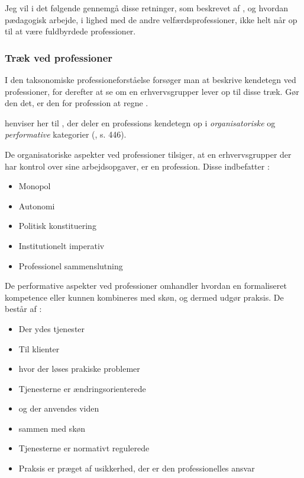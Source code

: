 Jeg vil i det følgende gennemgå disse retninger, som beskrevet af \citeauthor{frederiksenVelfaerdsprofessionerMellemOmsorg2017}, og hvordan pædagogisk arbejde, i lighed med de andre velfærdsprofessioner, ikke helt når op til at være fuldbyrdede professioner.

\subsubsection{Træk ved professioner}
I den taksonomiske professioneforståelse forsøger man at beskrive kendetegn ved professioner, for derefter at se om en erhvervsgrupper lever op til disse træk.
Gør den det, er den for profession at regne \autocite[s.446]{frederiksenVelfaerdsprofessionerMellemOmsorg2017}.

\citeauthor{frederiksenVelfaerdsprofessionerMellemOmsorg2017} henviser her til \citeauthor{molanderProfesjonsstudierIntroduksjon2008}, der deler en professions kendetegn op i \textit{organisatoriske} og \textit{performative} kategorier (\citeyear{frederiksenVelfaerdsprofessionerMellemOmsorg2017}, s. 446).

De organisatoriske aspekter ved professioner tilsiger, at en erhvervsgrupper der har kontrol over sine arbejdsopgaver, er en profession. Disse indbefatter \autocite[s. 18ff]{molanderProfesjonsstudierIntroduksjon2008}:
\begin{itemize}
  \item
    Monopol
  \item
    Autonomi
  \item
    Politisk konstituering
  \item
    Institutionelt imperativ
  \item
    Professionel sammenslutning
\end{itemize}

De performative aspekter ved professioner omhandler hvordan en formaliseret kompetence eller kunnen kombineres med skøn, og dermed udgør praksis. De består af \autocite[s 19ff]{molanderProfesjonsstudierIntroduksjon2008}:
\begin{itemize}
  \item
    Der ydes tjenester
  \item
    Til klienter
  \item
    hvor der løses prakiske problemer
  \item
    Tjenesterne er ændringsorienterede
  \item
    og der anvendes viden
  \item
    sammen med skøn
  \item
    Tjenesterne er normativt regulerede
  \item
    Praksis er præget af usikkerhed, der er den professionelles ansvar
\end{itemize}

